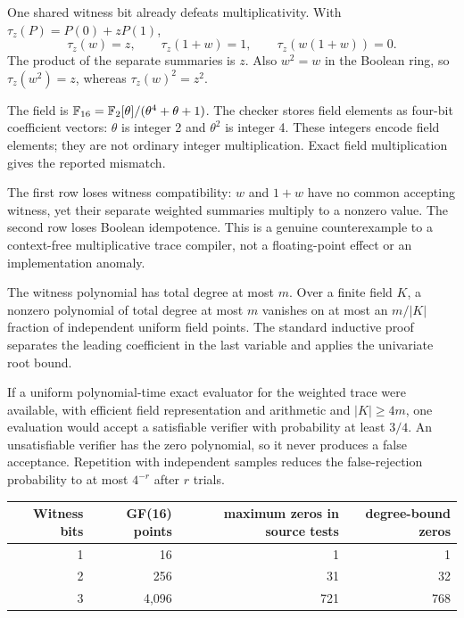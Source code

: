 One shared witness bit already defeats multiplicativity. With
$\tau_z(P)=P(0)+zP(1)$,
\[
 \tau_z(w)=z,\qquad \tau_z(1+w)=1,
 \qquad \tau_z(w(1+w))=0.
\]
The product of the separate summaries is $z$. Also $w^2=w$ in the Boolean
ring, so $\tau_z(w^2)=z$, whereas $\tau_z(w)^2=z^2$.


The field is $\mathbb F_{16}=\mathbb F_2[\theta]/(\theta^4+\theta+1)$. The checker stores
field elements as four-bit coefficient vectors: $\theta$ is integer 2 and
$\theta^2$ is integer 4. These integers encode field elements; they are not
ordinary integer multiplication. Exact field multiplication gives the
reported mismatch.

The first row loses witness compatibility: $w$ and $1+w$ have no common
accepting witness, yet their separate weighted summaries multiply to a
nonzero value. The second row loses Boolean idempotence. This is a genuine
counterexample to a context-free multiplicative trace compiler, not a
floating-point effect or an implementation anomaly.


The witness polynomial has total degree at most $m$. Over a finite field
$K$, a nonzero polynomial of total degree at most $m$ vanishes on at most
an $m/|K|$ fraction of independent uniform field points. The standard
inductive proof separates the leading coefficient in the last variable
and applies the univariate root bound.

If a uniform polynomial-time exact evaluator for the weighted trace were
available, with efficient field representation and arithmetic and
$|K|\ge4m$, one evaluation would accept a satisfiable verifier with
probability at least $3/4$. An unsatisfiable verifier has the zero polynomial,
so it never produces a false acceptance. Repetition with independent samples
reduces the false-rejection probability to at most $4^{-r}$ after $r$ trials.

\begin{center}
\begin{tabular}{@{}rrrr@{}}\toprule
Witness bits & GF(16) points & maximum zeros in source tests & degree-bound zeros\\\midrule
1 & 16 & 1 & 1\\
2 & 256 & 31 & 32\\
3 & 4,096 & 721 & 768\\\bottomrule
\end{tabular}
\end{center}


